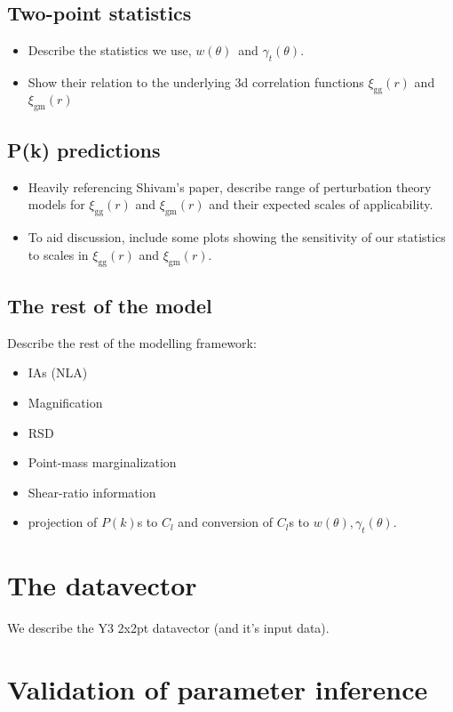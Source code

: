 \documentclass[fleqn,usenatbib]{mnras}
\newcommand{\gammat}{\ensuremath{\gamma_{t}(\theta)}}
\newcommand{\wtheta}{\ensuremath{w(\theta)}}
\newcommand{\xigg}{\ensuremath{\xi_{\mathrm{gg}}}}
\newcommand{\xigm}{\ensuremath{\xi_{\mathrm{gm}}}}
\begin{document}
\subsection{Two-point statistics}

\begin{itemize}
    \item Describe the statistics we use, \wtheta\ and \gammat.
    \item Show their relation to the underlying 3d correlation functions $\xigg(r)$ and $\xigm(r)$
\end{itemize}

\subsection{P(k) predictions}
\begin{itemize}
    \item Heavily referencing Shivam's paper, describe range of perturbation theory models for $\xigg(r)$ and $\xigm(r)$ and their expected scales of applicability. 
    \item To aid discussion, include some plots showing the sensitivity of our statistics to scales in $\xigg(r)$ and $\xigm(r)$.
\end{itemize}

\subsection{The rest of the model}
Describe the rest of the modelling framework:
\begin{itemize}
    \item IAs (NLA)
    \item Magnification
    \item RSD
    \item Point-mass marginalization
    \item Shear-ratio information
    \item projection of $P(k)$s to $C_l$ and conversion of $C_l$s to $w(\theta),\gamma_t(\theta)$.
\end{itemize}

\section{The datavector}
We describe the Y3 2x2pt datavector (and it's input data).

\section{Validation of parameter inference}
\end{document}
